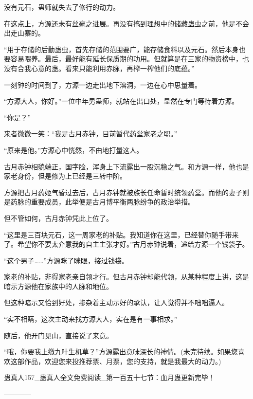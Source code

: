 \begin{this_body}
没有元石，蛊师就失去了修行的动力。

在这点上，方源还未有丝毫之进展。再没有搞到理想中的储藏蛊虫之前，他是不会出走山寨的。

“用于存储的后勤蛊虫，首先存储的范围要广，能存储食料以及元石。然后本身也要容易喂养。最后，最好能有延长保质期的功用。但就算是在三家的物资榜中，也没有合我心意的蛊。看来只能利用赤脉，再榨一榨他们的底蕴。”

一刻钟的时间到了，方源一边走出地下溶洞，一边在心中思量着。

“方源大人，你好。”一位中年男蛊师，就站在出口处，显然在专门等待着方源。

“你是？”

来者微微一笑：“我是古月赤钟，目前暂代药堂家老之职。”

“原来是他。”方源心中恍然，不由地打量这人。

古月赤钟相貌端正，国字脸，浑身上下流露出一股沉稳之气。和方源一样，他也是家老身份，但是修为上已经是三转中阶。

方源把古月药姬气昏过去后，古月赤钟就被族长任命暂时统领药堂。而他的妻子则是药脉的重要成员，此举便是古月博平衡两脉纷争的政治举措。

但不管如何，古月赤钟凭此上位了。

“这里是三百块元石，这一周家老的补贴。我知道你在这里，已经替你随手带来了。希望你不要太介意我的自主主张才好。”古月赤钟说着，递给方源一个钱袋子。

“这个男子……”方源眯了眯眼，接过钱袋。

家老的补贴，非得家老亲自领才行。但古月赤钟却能代领，从某种程度上讲，这是暗示方源他在家族中的人脉和地位。

但这种暗示又恰到好处，掺杂着主动示好的承认，让人觉得并不咄咄逼人。

“实不相瞒，这次主动来找方源大人，实在是有一事相求。”

随后，他开门见山，直接说了来意。

“哦，你要我上缴九叶生机草？”方源露出意味深长的神情。(未完待续。如果您喜欢这部作品，欢迎您来投推荐票、月票，您的支持，就是我最大的动力。)

蛊真人157\_蛊真人全文免费阅读\_第一百五十七节：血月蛊更新完毕！

------------

\end{this_body}

